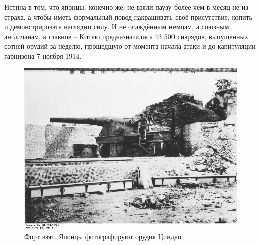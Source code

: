 Истина в том, что японцы, конечно же, не взяли паузу более чем в месяц не из страха, а чтобы иметь формальный повод накрашивать своё присутствие, копить и демонстрировать наглядно силу. И не осаждённым немцам, а союзным англичанам, а главное – Китаю предназначались 43 500 снарядов, выпущенных сотней орудий за неделю, прошедшую от момента начала атаки и до капитуляции гарнизона 7 ноября 1914. 

\begin{figure}[h!tb] 
	\centering\includegraphics[scale=0.3]{Glava3/swS61nu3Jqs.jpg}
	\caption{Форт взят. Японцы фотографируют орудия Циндао}%
\end{figure}